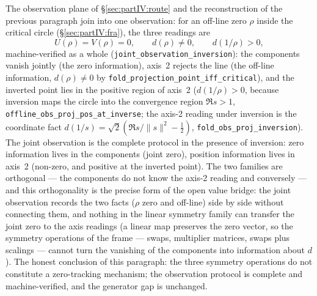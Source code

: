 \documentclass{article}
\begin{document}
The observation plane of \S\ref{sec:partIV:route} and the
reconstruction of the previous paragraph join into one observation:
for an off-line zero $\rho$ inside the critical circle
(\S\ref{sec:partIV:fra}), the three readings are
\begin{equation}
  U(\rho)=V(\rho)=0,\qquad d(\rho)\ne 0,\qquad d(1/\rho)>0,
\end{equation}
machine-verified as a whole (\texttt{joint\_observation\_inversion}):
the components vanish jointly (the zero information), axis~2 rejects
the line (the off-line information, $d(\rho)\ne0$ by
\texttt{fold\_projection\_point\_iff\_critical}), and the inverted
point lies in the positive region of axis~2 ($d(1/\rho)>0$, because
inversion maps the circle into the convergence region $\Re s>1$,
\texttt{offline\_obs\_proj\_pos\_at\_inverse}; the axis-2 reading under
inversion is the coordinate fact
$d(1/s)=\sqrt2(\Re s/\|s\|^2-\tfrac12)$,
\texttt{fold\_obs\_proj\_inversion}). The joint observation is the
complete protocol in the presence of inversion: zero information lives
in the components (joint zero), position information lives in axis~2
(non-zero, and positive at the inverted point). The two families are
orthogonal --- the components do not know the axis-2 reading and
conversely --- and this orthogonality is the precise form of the open
value bridge: the joint observation records the two facts
($\rho$ zero and off-line) side by side without connecting them, and
nothing in the linear symmetry family can transfer the joint zero to
the axis readings (a linear map preserves the zero vector, so the
symmetry operations of the frame --- swaps, multiplier matrices, swaps
plus scalings --- cannot turn the vanishing of the components into
information about $d$). The honest conclusion of this paragraph: the
three symmetry operations do not constitute a zero-tracking mechanism;
the observation protocol is complete and machine-verified, and the
generator gap is unchanged.
\end{document}
